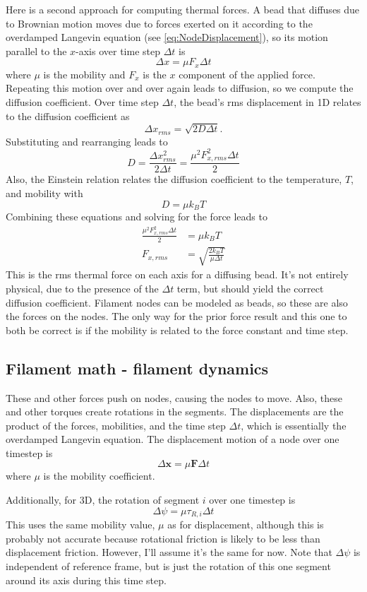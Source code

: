 \documentclass {scrbook}
\begin{document}
Here is a second approach for computing thermal forces. A bead that diffuses due to Brownian motion moves due to forces exerted on it according to the overdamped Langevin equation (see \ref{eq:NodeDisplacement}), so its motion parallel to the $x$-axis over time step $\Delta t$ is
$$\Delta x = \mu F_x \Delta t$$
where $\mu$ is the mobility and $F_x$ is the $x$ component of the applied force. Repeating this motion over and over again leads to diffusion, so we compute the diffusion coefficient. Over time step $\Delta t$, the bead's rms displacement in 1D relates to the diffusion coefficient as
$$\Delta x_{rms} = \sqrt{2 D \Delta t}.$$
Substituting and rearranging leads to
$$D = \frac{\Delta x_{rms}^2}{2 \Delta t} = \frac{\mu^2 F_{x,rms}^2 \Delta t}{2}$$
Also, the Einstein relation relates the diffusion coefficient to the temperature, $T$, and mobility with
$$D=\mu k_B T$$
Combining these equations and solving for the force leads to
\begin{align}
\frac{\mu^2 F_{x,rms}^2 \Delta t}{2} &= \mu k_B T \nonumber \\
F_{x,rms} &= \sqrt{\frac{2 k_B T}{\mu \Delta t}}
\label{eq:ThermalForce1}
\end{align}
This is the rms thermal force on each axis for a diffusing bead. It's not entirely physical, due to the presence of the $\Delta t$ term, but should yield the correct diffusion coefficient. Filament nodes can be modeled as beads, so these are also the forces on the nodes. The only way for the prior force result and this one to both be correct is if the mobility is related to the force constant and time step.

\subsection{Filament math - filament dynamics}

These and other forces push on nodes, causing the nodes to move. Also, these and other torques create rotations in the segments. The displacements are the product of the forces, mobilities, and the time step $\Delta t$, which is essentially the overdamped Langevin equation. The displacement motion of a node over one timestep is
\begin{equation}
\Delta \bm{x} = \mu \bm{F} \Delta t
\label{eq:NodeDisplacement}
\end{equation}
where $\mu$ is the mobility coefficient.

Additionally, for 3D, the rotation of segment $i$ over one timestep is
\begin{equation}
\Delta \psi = \mu \tau_{R,i} \Delta t
\label{eq:SegmentRoll}
\end{equation}
This uses the same mobility value, $\mu$ as for displacement, although this is probably not accurate because rotational friction is likely to be less than displacement friction. However, I'll assume it's the same for now. Note that $\Delta \psi$ is independent of reference frame, but is just the rotation of this one segment around its axis during this time step.
\end{document}
